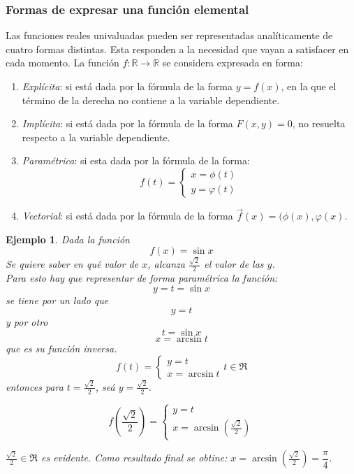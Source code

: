 \documentclass[10pt,twoside]{SelfArx} %
\begin{document}
\subsubsection{Formas de expresar una función elemental}

 Las funciones reales univaluadas pueden ser representadas anal\'iticamente de cuatro formas distintas. Esta responden a la necesidad que vayan a satisfacer en cada momento.
\label{formas_expresar_func}
La función $ f:\mathbb{R} \rightarrow \mathbb{R} $ se considera expresada en forma:\\
\begin{enumerate}
	\item \textsl{Explícita}: si está dada por la fórmula de la forma $ y=f(x) $, en la que el término de la derecha no contiene a la variable dependiente.
	
	\item \textsl{Implícita}: si está dada por la fórmula de la forma $ F(x,y)=0 $, no resuelta respecto a la variable dependiente.
	\item \textsl{Paramétrica}: si esta dada por la fórmula de la forma:
	\[ f(t)=\begin{cases}
		x=\phi (t)\\
		y=\varphi(t)
		\end{cases} \]
	\item 	\textsl{Vectorial}: si está dada por la fórmula de la forma $ \vec{f}(x)=(\phi(x),\varphi(x) $.
	
	
\end{enumerate}

\newtheorem{ejemplo}{Ejemplo}
\begin{ejemplo}
	Dada la funci\'on 
	\[ f(x)=\sin x \]
	Se quiere saber en qu\'e valor  de $ x $, alcanza $ \frac{\sqrt{2}}{2} $ el valor de las $ y $.\\
	Para esto hay que representar de forma param\'etrica la funci\'on:
	\[ y=t=\sin x \]
	se tiene por un lado que
	\[ y=t \]
	y por otro
	\[ t=\sin x \]
	\[ x=\arcsin t \]
	que es su funci\'on inversa.
	\[ 
	f(t)=
	\begin{cases}
	y=t\\
	x=\arcsin t
	\end{cases}
	t\in \Re
	 \]
	 entonces para $ t=\frac{\sqrt{2}}{2} $, se\'a $ y= \frac{\sqrt{2}}{2} $.
	 
	 
	 	\[ 
	 	f\left (\frac{\sqrt{2}}{2}\right )=
	 	\begin{cases}
	 	y=t\\
	 	x=\arcsin \left (\frac{\sqrt{2}}{2}\right )
	
	 	\end{cases}
	 	\] 	

	 $ 	\frac{\sqrt{2}}{2}\in \Re  $ es evidente.
	 Como resultado final se obtine: $ x=\arcsin \left (\frac{\sqrt{2}}{2}\right )=\dfrac{\pi}{4} $.
\end{ejemplo}
\end{document}
